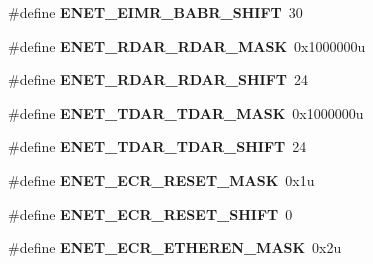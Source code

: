 \begin{DoxyCompactItemize}
\item 
\#define {\bfseries E\+N\+E\+T\+\_\+\+E\+I\+M\+R\+\_\+\+B\+A\+B\+R\+\_\+\+S\+H\+I\+FT}~30\hypertarget{group__ENET__Register__Masks_ga21dfb3f07aa8f8591b954d3a3e91cd81}{}\label{group__ENET__Register__Masks_ga21dfb3f07aa8f8591b954d3a3e91cd81}

\item 
\#define {\bfseries E\+N\+E\+T\+\_\+\+R\+D\+A\+R\+\_\+\+R\+D\+A\+R\+\_\+\+M\+A\+SK}~0x1000000u\hypertarget{group__ENET__Register__Masks_gaf4ddad52a6258f0e5958ab67f26a5a00}{}\label{group__ENET__Register__Masks_gaf4ddad52a6258f0e5958ab67f26a5a00}

\item 
\#define {\bfseries E\+N\+E\+T\+\_\+\+R\+D\+A\+R\+\_\+\+R\+D\+A\+R\+\_\+\+S\+H\+I\+FT}~24\hypertarget{group__ENET__Register__Masks_ga6f04308372016c60e2cb80485451e9d9}{}\label{group__ENET__Register__Masks_ga6f04308372016c60e2cb80485451e9d9}

\item 
\#define {\bfseries E\+N\+E\+T\+\_\+\+T\+D\+A\+R\+\_\+\+T\+D\+A\+R\+\_\+\+M\+A\+SK}~0x1000000u\hypertarget{group__ENET__Register__Masks_ga5758f935dabab51a86c68161bce5be1b}{}\label{group__ENET__Register__Masks_ga5758f935dabab51a86c68161bce5be1b}

\item 
\#define {\bfseries E\+N\+E\+T\+\_\+\+T\+D\+A\+R\+\_\+\+T\+D\+A\+R\+\_\+\+S\+H\+I\+FT}~24\hypertarget{group__ENET__Register__Masks_gae2d1ffef71e20daf95833ce26619b212}{}\label{group__ENET__Register__Masks_gae2d1ffef71e20daf95833ce26619b212}

\item 
\#define {\bfseries E\+N\+E\+T\+\_\+\+E\+C\+R\+\_\+\+R\+E\+S\+E\+T\+\_\+\+M\+A\+SK}~0x1u\hypertarget{group__ENET__Register__Masks_ga3b154308b2f4ab59eb5e0bed4f38cb70}{}\label{group__ENET__Register__Masks_ga3b154308b2f4ab59eb5e0bed4f38cb70}

\item 
\#define {\bfseries E\+N\+E\+T\+\_\+\+E\+C\+R\+\_\+\+R\+E\+S\+E\+T\+\_\+\+S\+H\+I\+FT}~0\hypertarget{group__ENET__Register__Masks_ga717ccaad52747f6a8be4eae66d95d178}{}\label{group__ENET__Register__Masks_ga717ccaad52747f6a8be4eae66d95d178}

\item 
\#define {\bfseries E\+N\+E\+T\+\_\+\+E\+C\+R\+\_\+\+E\+T\+H\+E\+R\+E\+N\+\_\+\+M\+A\+SK}~0x2u\hypertarget{group__ENET__Register__Masks_ga126db2064186c551ab345ff5331b943b}{}\label{group__ENET__Register__Masks_ga126db2064186c551ab345ff5331b943b}


\end{DoxyCompactItemize}
